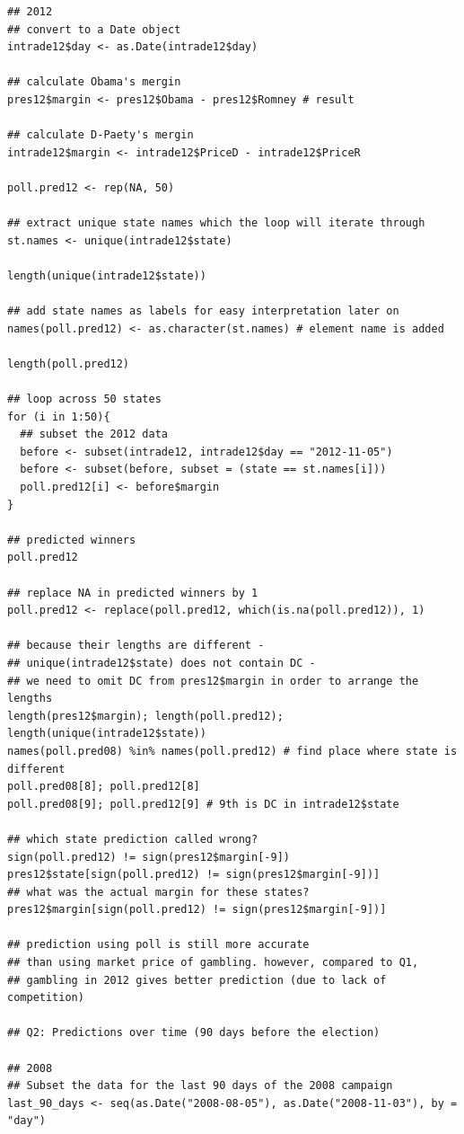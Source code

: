 \documentclass[12pt]{article}
\begin{document}
{\begin{verbatim}
## 2012
## convert to a Date object
intrade12$day <- as.Date(intrade12$day)

## calculate Obama's mergin
pres12$margin <- pres12$Obama - pres12$Romney # result

## calculate D-Paety's mergin
intrade12$margin <- intrade12$PriceD - intrade12$PriceR

poll.pred12 <- rep(NA, 50)

## extract unique state names which the loop will iterate through 
st.names <- unique(intrade12$state)

length(unique(intrade12$state))

## add state names as labels for easy interpretation later on
names(poll.pred12) <- as.character(st.names) # element name is added 

length(poll.pred12)

## loop across 50 states 
for (i in 1:50){
  ## subset the 2012 data
  before <- subset(intrade12, intrade12$day == "2012-11-05")
  before <- subset(before, subset = (state == st.names[i]))
  poll.pred12[i] <- before$margin
}

## predicted winners
poll.pred12

## replace NA in predicted winners by 1
poll.pred12 <- replace(poll.pred12, which(is.na(poll.pred12)), 1)

## because their lengths are different -
## unique(intrade12$state) does not contain DC - 
## we need to omit DC from pres12$margin in order to arrange the lengths
length(pres12$margin); length(poll.pred12); length(unique(intrade12$state))
names(poll.pred08) %in% names(poll.pred12) # find place where state is different
poll.pred08[8]; poll.pred12[8]
poll.pred08[9]; poll.pred12[9] # 9th is DC in intrade12$state

## which state prediction called wrong? 
sign(poll.pred12) != sign(pres12$margin[-9])
pres12$state[sign(poll.pred12) != sign(pres12$margin[-9])]
## what was the actual margin for these states? 
pres12$margin[sign(poll.pred12) != sign(pres12$margin[-9])]

## prediction using poll is still more accurate 
## than using market price of gambling. however, compared to Q1, 
## gambling in 2012 gives better prediction (due to lack of competition) 

## Q2: Predictions over time (90 days before the election)

## 2008
## Subset the data for the last 90 days of the 2008 campaign
last_90_days <- seq(as.Date("2008-08-05"), as.Date("2008-11-03"), by = "day")


\end{verbatim}}
\end{document}
